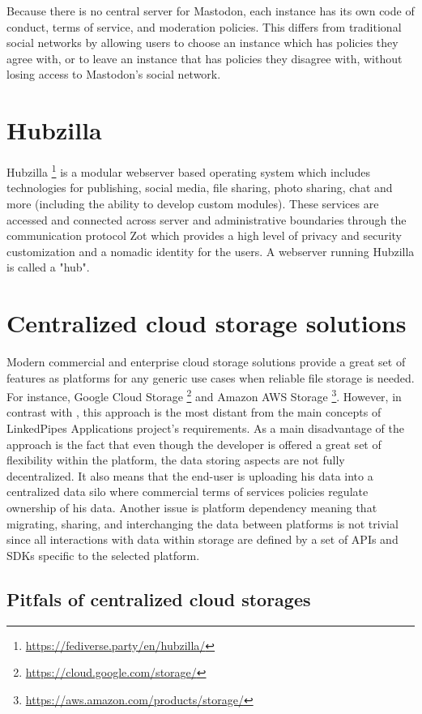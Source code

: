 Because there is no central server for Mastodon, each instance has its own code of conduct, terms of service, and moderation policies. This differs from traditional social networks by allowing users to choose an instance which has policies they agree with, or to leave an instance that has policies they disagree with, without losing access to Mastodon's social network.

\section{Hubzilla}

Hubzilla \footnote{\url{https://fediverse.party/en/hubzilla/}} is a modular webserver based operating system which includes technologies for publishing, social media, file sharing, photo sharing, chat and more (including the ability to develop custom modules). These services are accessed and connected across server and administrative boundaries through the communication protocol Zot which provides a high level of privacy and security customization and a nomadic identity for the users. A webserver running Hubzilla is called a "hub".

\section{Centralized cloud storage solutions}

Modern commercial and enterprise cloud storage solutions provide a great set of features as platforms for any generic use cases when reliable file storage is needed. For instance, Google Cloud Storage \footnote{\url{https://cloud.google.com/storage/}} and Amazon AWS Storage \footnote{\url{https://aws.amazon.com/products/storage/}}. However, in contrast with \solid{}, this approach is the most distant from the main concepts of LinkedPipes Applications project’s requirements. As a main disadvantage of the approach is the fact that even though the developer is offered a great set of flexibility within the platform, the data storing aspects are not fully decentralized. It also means that the end-user is uploading his data into a centralized data silo where commercial terms of services policies regulate ownership of his data. Another issue is platform dependency meaning that migrating, sharing, and interchanging the data between platforms is not trivial since all interactions with data within storage are defined by a set of APIs and SDKs specific to the selected platform. 

\subsection{Pitfals of centralized cloud storages}

